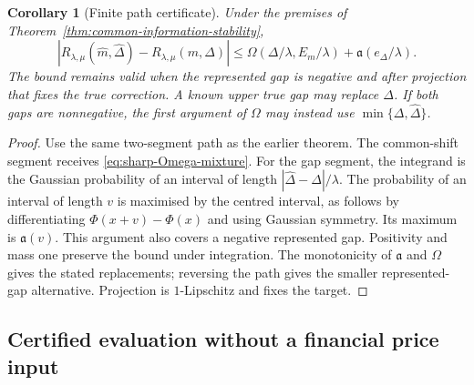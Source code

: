 \documentclass[11pt]{article}
\newtheorem{corollary}[theorem]{Corollary}
\begin{document}
\begin{corollary}[Finite path certificate]
\label{cor:sharp-finite-path}
Under the premises of Theorem~\ref{thm:common-information-stability},
\begin{equation}
 |R_{\lambda,\mu}(\widehat m,\widehat\Delta)
                        -R_{\lambda,\mu}(m,\Delta)|
 \leq\Omega(\Delta/\lambda,E_m/\lambda)
                       +\mathfrak a(e_\Delta/\lambda).
 \label{eq:sharp-finite-path}
\end{equation}
The bound remains valid when the represented gap is negative and after
projection that fixes the true correction. A known upper true gap may
replace $\Delta$. If both gaps are nonnegative, the first argument of
$\Omega$ may instead use $\min\{\Delta,\widehat\Delta\}$.
\end{corollary}
\begin{proof}
Use the same two-segment path as the earlier theorem. The common-shift
segment receives \eqref{eq:sharp-Omega-mixture}. For the gap segment,
the integrand is the Gaussian probability of an interval of length
$|\widehat\Delta-\Delta|/\lambda$. The probability of an interval
of length $v$ is maximised by the centred interval, as follows by
differentiating $\Phi(x+v)-\Phi(x)$ and using Gaussian symmetry.
Its maximum is $\mathfrak a(v)$. This argument also covers a negative represented
gap. Positivity and mass one preserve the bound under integration.
The monotonicity of $\mathfrak a$ and $\Omega$ gives the stated replacements;
reversing the path gives the smaller represented-gap alternative.
Projection is $1$-Lipschitz and fixes the target.
\end{proof}

\subsection{Certified evaluation without a financial price input}
\end{document}
